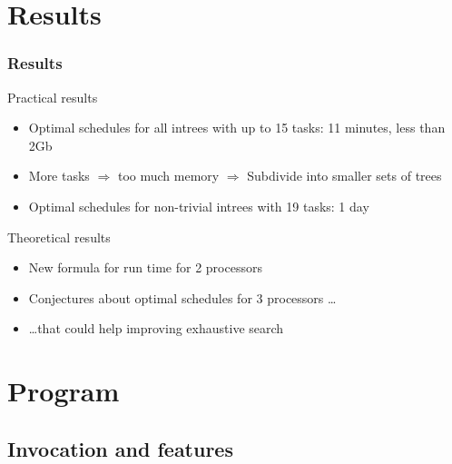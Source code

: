 \documentclass{beamer}
\begin{document}
\section{Results}

\begin{frame}
  \frametitle{Results}
  \begin{block}{Practical results}
    \begin{itemize}
    \item Optimal schedules for all intrees with up to 15 tasks: 11 minutes, less than 2Gb
    \item More tasks $\Rightarrow$ too much memory $\Rightarrow$ Subdivide into smaller sets of trees
    \item Optimal schedules for non-trivial intrees with 19 tasks: 1 day
    \end{itemize}
  \end{block}
  \begin{block}{Theoretical results}
    \begin{itemize}
    \item New formula for run time for 2 processors
    \item Conjectures about optimal schedules for 3 processors \dots
    \item \dots that could help improving exhaustive search
    \end{itemize}
  \end{block}
\end{frame}

\appendix

\section{Program}

\subsection{Invocation and features}
\end{document}
